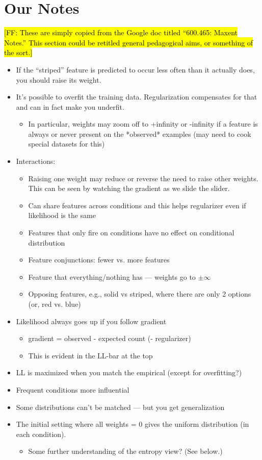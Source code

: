 \documentclass[11pt,letterpaper]{article}
\newcommand{\Note}[1]{}
\renewcommand{\Note}[1]{\hl{[#1]}}
\newcommand{\NoteSigned}[3]{{\sethlcolor{#2}\Note{#1: #3}}}
\newcommand{\NoteFF}[1]{\NoteSigned{FF}{LightBlue}{#1}}
\begin{document}
\section{Our Notes}
\NoteFF{These are simply copied from the Google doc titled ``600.465: Maxent Notes.'' This section could be retitled general pedagogical aims, or something of the sort.}
\begin{itemize}
\item If the “striped” feature is predicted to occur less often than it actually does, you should raise its weight.
\item It’s possible to overfit the training data.  Regularization compensates for that and can in fact make you underfit.
\begin{itemize}
\item In particular, weights may zoom off to +infinity or -infinity if a feature is always or never present on the *observed* examples (may need to cook special datasets for this)
\end{itemize}
\item Interactions:
\begin{itemize} 
\item Raising one weight may reduce or reverse the need to raise other weights.  This can be seen by watching the gradient as we slide the slider.
\item Can share features across conditions and this helps regularizer even if likelihood is the same
\item Features that only fire on conditions have no effect on conditional distribution
\item Feature conjunctions: fewer vs. more features
\item Feature that everything/nothing has --- weights go to $\pm \infty$
\item Opposing features, e.g., solid vs striped, where there are only 2 options (or, red vs. blue)
\end{itemize}
\item Likelihood always goes up if you follow gradient
\begin{itemize}
\item gradient = observed - expected count (- regularizer)
\item This is evident in the LL-bar at the top
\end{itemize}
\item LL is maximized when you match the empirical (except for overfitting?)
\item Frequent conditions more influential
\item Some distributions can’t be matched --- but you get generalization
\item The initial setting where all weights = 0 gives the uniform distribution (in each condition).
\begin{itemize}
\item Some further understanding of the entropy view?  (See below.)
\end{itemize}
\end{itemize}
\end{document}
